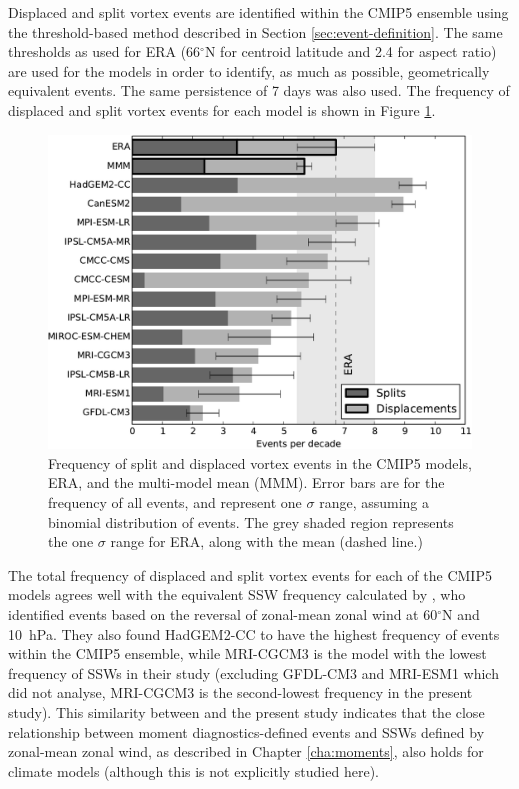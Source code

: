 Displaced and split vortex events are identified within the CMIP5 ensemble using
the threshold-based method described in Section \ref{sec:event-definition}. The
same thresholds as used for ERA (66$^{\circ}$N for centroid latitude and 2.4 for
aspect ratio) are used for the models in order to identify, as much as possible,
geometrically equivalent events. The same persistence of 7 days was also used.
The frequency of displaced and split vortex events for each model is shown in
Figure \ref{fig:cmip5_events_bar_stacked}.

\begin{figure}[htbp]
 \centering
 \noindent\includegraphics[width=\textwidth]{figures/chapter-models/events_bar_stacked.pdf}
 \caption[Frequency of split and displaced vortex events in the CMIP5
 models]{Frequency of split and displaced vortex events in the CMIP5 models,
   ERA, and the multi-model mean (MMM). Error bars are for the frequency of all
   events, and represent one $\sigma$ range, assuming a binomial distribution of
   events. The grey shaded region represents the one $\sigma$ range for ERA,
   along with the mean (dashed line.) }
 \label{fig:cmip5_events_bar_stacked}
\end{figure}

The total frequency of displaced and split vortex events for each of the CMIP5
models agrees well with the equivalent SSW frequency calculated by
\citet{Charlton-Perez2013}, who identified events based on the reversal of
zonal-mean zonal wind at 60$^{\circ}$N and 10~hPa. They also found HadGEM2-CC to
have the highest frequency of events within the CMIP5 ensemble, while MRI-CGCM3
is the model with the lowest frequency of SSWs in their study (excluding GFDL-CM3
and MRI-ESM1 which \citet{Charlton-Perez2013} did not analyse, MRI-CGCM3 is the
second-lowest frequency in the present study). This similarity between
\citet{Charlton-Perez2013} and the present study indicates that the close
relationship between moment diagnostics-defined events and SSWs defined by
zonal-mean zonal wind, as described in Chapter \ref{cha:moments}, also holds for
climate models (although this is not explicitly studied here).

